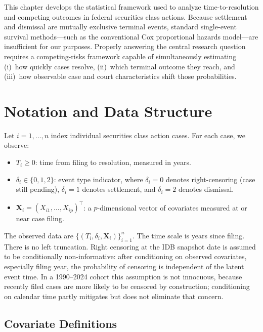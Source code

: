 This chapter develops the statistical framework used to analyze
time-to-resolution and competing outcomes in federal securities
class actions. Because settlement and dismissal are mutually
exclusive terminal events, standard single-event survival
methods---such as the conventional Cox proportional hazards
model---are insufficient for our purposes. Properly answering
the central research question requires a competing-risks
framework capable of simultaneously estimating (i)~how quickly
cases resolve, (ii)~which terminal outcome they reach, and
(iii)~how observable case and court characteristics shift those
probabilities.


\section{Notation and Data Structure}

Let $i = 1, \ldots, n$ index individual securities class action
cases. For each case, we observe:
\begin{itemize}
    \item $T_i \geq 0$: time from filing to resolution,
    measured in years.
    \item $\delta_i \in \{0, 1, 2\}$: event type indicator,
    where $\delta_i = 0$ denotes right-censoring (case still
    pending), $\delta_i = 1$ denotes settlement, and 
    $\delta_i = 2$ denotes dismissal.
    \item $\mathbf{X}_i = (X_{i1}, \ldots, X_{ip})^\top$: a 
    $p$-dimensional vector of covariates measured at or near
    case filing.
\end{itemize}

The observed data are $\{(T_i, \delta_i,
\mathbf{X}_i)\}_{i=1}^n$. The time scale is years since
filing. There is no left truncation. Right censoring at the
IDB snapshot date is assumed to be conditionally
non-informative: after conditioning on observed covariates,
especially filing year, the probability of censoring is independent of the latent
event time. In a
1990--2024 cohort this assumption is not innocuous, because
recently filed cases are more likely to be censored by
construction; conditioning on calendar time partly mitigates
but does not eliminate that concern.

\subsection{Covariate Definitions}

